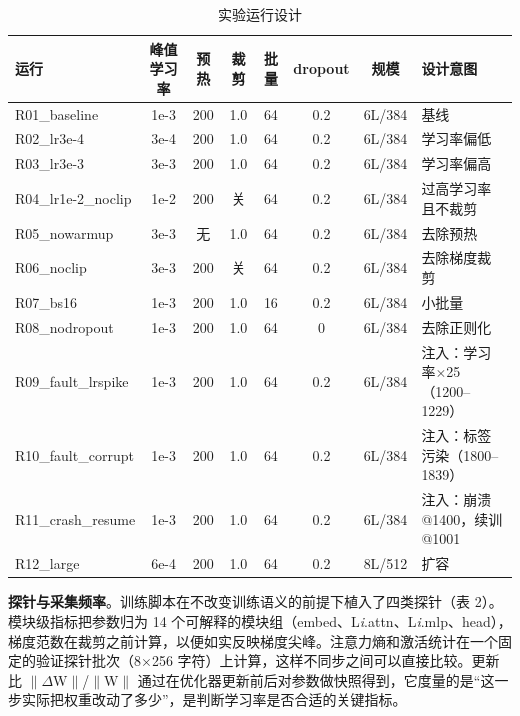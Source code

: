 \begin{table}[htbp]
\centering
\caption{实验运行设计}
\small
\begin{tabularx}{\linewidth}{XccccccX}
\toprule
\textbf{运行} & \textbf{峰值学习率} & \textbf{预热} & \textbf{裁剪} & \textbf{批量} & \textbf{dropout} & \textbf{规模} & \textbf{设计意图} \\
\midrule
R01\_baseline & 1e-3 & 200 & 1.0 & 64 & 0.2 & 6L/384 & 基线 \\
R02\_lr3e-4 & 3e-4 & 200 & 1.0 & 64 & 0.2 & 6L/384 & 学习率偏低 \\
R03\_lr3e-3 & 3e-3 & 200 & 1.0 & 64 & 0.2 & 6L/384 & 学习率偏高 \\
R04\_lr1e-2\_noclip & 1e-2 & 200 & 关 & 64 & 0.2 & 6L/384 & 过高学习率且不裁剪 \\
R05\_nowarmup & 3e-3 & 无 & 1.0 & 64 & 0.2 & 6L/384 & 去除预热 \\
R06\_noclip & 3e-3 & 200 & 关 & 64 & 0.2 & 6L/384 & 去除梯度裁剪 \\
R07\_bs16 & 1e-3 & 200 & 1.0 & 16 & 0.2 & 6L/384 & 小批量 \\
R08\_nodropout & 1e-3 & 200 & 1.0 & 64 & 0 & 6L/384 & 去除正则化 \\
R09\_fault\_lrspike & 1e-3 & 200 & 1.0 & 64 & 0.2 & 6L/384 & 注入：学习率$\times$25（1200–1229） \\
R10\_fault\_corrupt & 1e-3 & 200 & 1.0 & 64 & 0.2 & 6L/384 & 注入：标签污染（1800–1839） \\
R11\_crash\_resume & 1e-3 & 200 & 1.0 & 64 & 0.2 & 6L/384 & 注入：崩溃@1400，续训@1001 \\
R12\_large & 6e-4 & 200 & 1.0 & 64 & 0.2 & 8L/512 & 扩容 \\
\bottomrule
\end{tabularx}
\end{table}

\textbf{探针与采集频率}。训练脚本在不改变训练语义的前提下植入了四类探针（表 2）。模块级指标把参数归为 14 个可解释的模块组（embed、L\textit{i}.attn、L\textit{i}.mlp、head），梯度范数在裁剪之前计算，以便如实反映梯度尖峰。注意力熵和激活统计在一个固定的验证探针批次（8$\times$256 字符）上计算，这样不同步之间可以直接比较。更新比 $\|$$\Delta$W$\|$/$\|$W$\|$ 通过在优化器更新前后对参数做快照得到，它度量的是“这一步实际把权重改动了多少”，是判断学习率是否合适的关键指标\cite{r12}。


